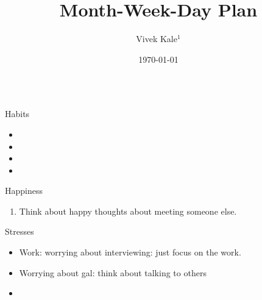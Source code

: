 \documentclass[serif, mathserif, final]{beamer}
\title{Month-Week-Day Plan}
\author{Vivek Kale$^1$}
\institute{$^1$ University of Illinois at Urbana-Champaign}
\date{\today}
\begin{document}
    

\begin{frame}{}
  \begin{columns}
    \begin{column}{0.25\linewidth} %
      \begin{block}{Habits}
        \begin{itemize}
          \tiny \item \tiny 
        \item \tiny 
        \item \tiny 
        \item \tiny 
        \end{itemize}
      \end{block}
      \begin{block}{Happiness} 
        \begin{enumerate}
          \tiny \item \tiny Think about happy thoughts about meeting
          someone else. 
        \end{enumerate}
      \end{block} 

      \begin{block}{Stresses}
        \begin{itemize}
        \item \tiny Work: worrying about interviewing: just
          focus on the work. 
        \item \tiny Worrying about gal: think about talking to
          others 
        \item \tiny 
        \end{itemize}
      \end{block}


\end{column}
\end{columns}
\end{frame}
\end{document}
